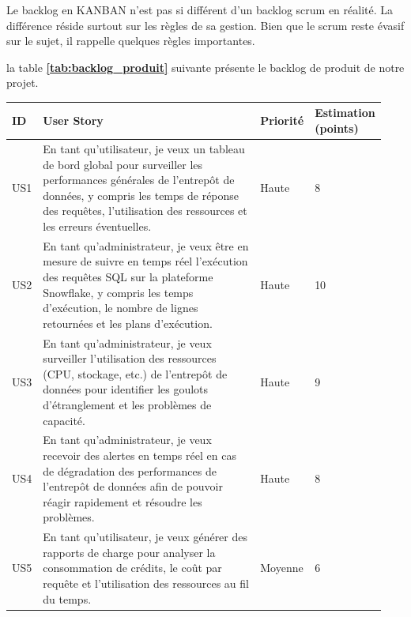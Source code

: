  \par Le backlog en KANBAN n’est pas si différent d’un backlog scrum en réalité. La différence réside surtout sur les règles de sa gestion. Bien que le scrum reste évasif sur le sujet, il rappelle quelques règles importantes. \cite{BPK}  
    
    \par la table \textbf{\ref{tab:backlog_produit}} suivante présente le backlog de produit de notre projet. 
\begin{center}

    \begin{longtable}{|p{0.05\linewidth}|p{0.65\linewidth}|p{0.12\linewidth}|p{0.12\linewidth}|}
        \hline       
        \rowcolor{blue!18}\textbf{ID} & \textbf{User Story} &  \textbf{Priorité} & \textbf{Estimation (points)} \\
        \hline
        \endfirsthead
        US1 &  En tant qu'utilisateur, je veux un tableau de bord global pour surveiller les performances générales de l'entrepôt de données, y compris les temps de réponse des requêtes, l'utilisation des ressources et les erreurs éventuelles. & Haute & 8 \\
        
        \hline
        
        US2 &  En tant qu'administrateur, je veux être en mesure de suivre en temps réel l'exécution des requêtes SQL sur la plateforme Snowflake, y compris les temps d'exécution, le nombre de lignes retournées et les plans d'exécution. & Haute & 10 \\
        
        \hline
        
        US3 &  En tant qu'administrateur, je veux surveiller l'utilisation des ressources (CPU, stockage, etc.) de l'entrepôt de données pour identifier les goulots d'étranglement et les problèmes de capacité. & Haute & 9 \\
        
        \hline
        
        US4 &  En tant qu'administrateur, je veux recevoir des alertes en temps réel en cas de dégradation des performances de l'entrepôt de données afin de pouvoir réagir rapidement et résoudre les problèmes. & Haute & 8 \\
        
        \hline
        
        US5 & En tant qu'utilisateur, je veux générer des rapports de charge pour analyser la consommation de crédits, le coût par requête et l'utilisation des ressources au fil du temps. & Moyenne & 6 \\
        

\end{longtable}
\end{center}
